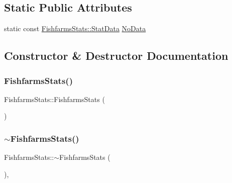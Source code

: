 \subsection*{Static Public Attributes}
\begin{DoxyCompactItemize}
\item 
static const \mbox{\hyperlink{struct_fishfarms_stats_1_1_stat_data}{Fishfarms\+Stats\+::\+Stat\+Data}} \mbox{\hyperlink{class_fishfarms_stats_ac60ff6ceca13b1384089c5723df34bc6}{No\+Data}}
\end{DoxyCompactItemize}


\subsection{Constructor \& Destructor Documentation}
\mbox{\label{class_fishfarms_stats_a8df36900fc6e603b138bb62eb32583f9}} 
\subsubsection{\texorpdfstring{FishfarmsStats()}{FishfarmsStats()}\hspace{0.1cm}{\footnotesize\ttfamily [1/3]}}
{\footnotesize\ttfamily Fishfarms\+Stats\+::\+Fishfarms\+Stats (\begin{DoxyParamCaption}{ }\end{DoxyParamCaption})}

\mbox{\label{class_fishfarms_stats_a78b1d47662845876ddb77e9c379664e9}} 
\subsubsection{\texorpdfstring{$\sim$FishfarmsStats()}{~FishfarmsStats()}}
{\footnotesize\ttfamily Fishfarms\+Stats\+::$\sim$\+Fishfarms\+Stats (\begin{DoxyParamCaption}{ }\end{DoxyParamCaption})\hspace{0.3cm}{\ttfamily [default]}, {\ttfamily [noexcept]}}

\mbox{\label{class_fishfarms_stats_a30cb9faf5577c5299a7442e1fcab14be}} 

